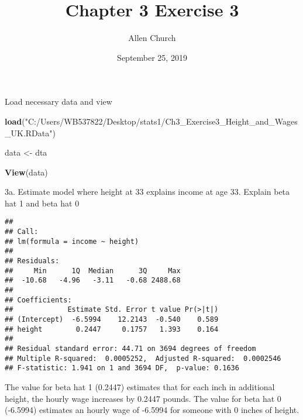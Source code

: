 \documentclass[]{article}
\title{Chapter 3 Exercise 3}
\author{Allen Church}
\date{September 25, 2019}
\newenvironment{Shaded}{\begin{snugshade}}{\end{snugshade}}
\newcommand{\KeywordTok}[1]{\textcolor[rgb]{0.13,0.29,0.53}{\textbf{#1}}}
\newcommand{\StringTok}[1]{\textcolor[rgb]{0.31,0.60,0.02}{#1}}
\newcommand{\CommentTok}[1]{\textcolor[rgb]{0.56,0.35,0.01}{\textit{#1}}}
\newcommand{\OperatorTok}[1]{\textcolor[rgb]{0.81,0.36,0.00}{\textbf{#1}}}
\newcommand{\NormalTok}[1]{#1}
\begin{document}
\maketitle

Load necessary data and view

\begin{Shaded}
\begin{Highlighting}[]
\KeywordTok{load}\NormalTok{(}\StringTok{"C:/Users/WB537822/Desktop/stats1/Ch3_Exercise3_Height_and_Wages_UK.RData"}\NormalTok{)}

\NormalTok{data <-}\StringTok{ }\NormalTok{dta}

\KeywordTok{View}\NormalTok{(data)}
\end{Highlighting}
\end{Shaded}

3a. Estimate model where height at 33 explains income at age 33. Explain
beta hat 1 and beta hat 0

\begin{Shaded}
\end{Shaded}

\begin{verbatim}
## 
## Call:
## lm(formula = income ~ height)
## 
## Residuals:
##     Min      1Q  Median      3Q     Max 
##  -10.68   -4.96   -3.11   -0.68 2488.68 
## 
## Coefficients:
##             Estimate Std. Error t value Pr(>|t|)
## (Intercept)  -6.5994    12.2143  -0.540    0.589
## height        0.2447     0.1757   1.393    0.164
## 
## Residual standard error: 44.71 on 3694 degrees of freedom
## Multiple R-squared:  0.0005252,  Adjusted R-squared:  0.0002546 
## F-statistic: 1.941 on 1 and 3694 DF,  p-value: 0.1636
\end{verbatim}

The value for beta hat 1 (0.2447) estimates that for each inch in
additional height, the hourly wage increases by 0.2447 pounds. The value
for beta hat 0 (-6.5994) estimates an hourly wage of -6.5994 for someone
with 0 inches of height.
\end{document}
